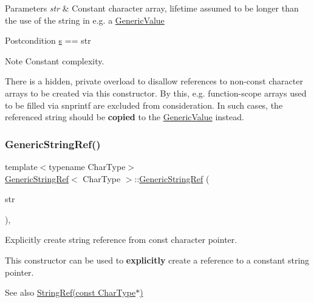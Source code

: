 \begin{DoxyParams}{Parameters}
{\em str} & Constant character array, lifetime assumed to be longer than the use of the string in e.\+g. a \hyperlink{a01992}{Generic\+Value}\\
\hline
\end{DoxyParams}
\begin{DoxyPostcond}{Postcondition}
\hyperlink{a02008_ac555994afd329bc9bc1780acf2f9d9be}{s} == str
\end{DoxyPostcond}
\begin{DoxyNote}{Note}
Constant complexity. 

There is a hidden, private overload to disallow references to non-\/const character arrays to be created via this constructor. By this, e.\+g. function-\/scope arrays used to be filled via {\ttfamily snprintf} are excluded from consideration. In such cases, the referenced string should be {\bfseries copied} to the \hyperlink{a01992}{Generic\+Value} instead. 
\end{DoxyNote}
\mbox{\label{a02008_a9e80d81d5ad49cf0fb4128ace8c548d9}} 
\subsubsection{\texorpdfstring{Generic\+String\+Ref()}{GenericStringRef()}\hspace{0.1cm}{\footnotesize\ttfamily [2/3]}}
{\footnotesize\ttfamily template$<$typename Char\+Type$>$ \\
\hyperlink{a02008}{Generic\+String\+Ref}$<$ Char\+Type $>$\+::\hyperlink{a02008}{Generic\+String\+Ref} (\begin{DoxyParamCaption}\item[{const Char\+Type $\ast$}]{str }\end{DoxyParamCaption})\hspace{0.3cm}{\ttfamily [inline]}, {\ttfamily [explicit]}}



Explicitly create string reference from {\ttfamily const} character pointer. 

This constructor can be used to {\bfseries explicitly} create a reference to a constant string pointer.

\begin{DoxySeeAlso}{See also}
\hyperlink{a02008_aa6b9fd9f6aa49405a574c362ba9af6b5}{String\+Ref(const Char\+Type$\ast$)}
\end{DoxySeeAlso}

